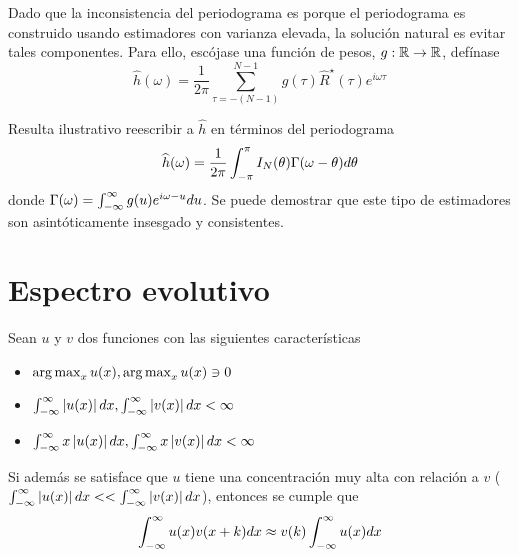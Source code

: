 Dado que la inconsistencia del periodograma es porque el periodograma es construido usando 
estimadores con varianza elevada, la solución natural es evitar tales componentes. Para ello, 
escójase una función de pesos, $g: \mathbb{R} \rightarrow \mathbb{R}$, defínase
%
\begin{equation}
\widehat{h}(\omega) = \frac{1}{2 \pi} \sum_{\tau = -(N-1)}^{N-1} g(\tau) \widehat{R}^{\star}(\tau) 
e^{i \omega \tau} 
\label{txt_estimador}
\end{equation}

Resulta ilustrativo reescribir a $\widehat{h}$ en términos del periodograma
\begin{equation*}
\widehat{h}(\omega) = \frac{1}{2 \pi} \int_{-\pi}^{\pi} I_N(\theta) \Gamma(\omega - \theta) d\theta
\end{equation*}
donde $\Gamma(\omega) = \int_{-\infty}^{\infty} g(u) e^{i \omega -u } du$.
%
Se puede demostrar que este tipo de estimadores son asintóticamente insesgado y consistentes.


\chapter{Espectro evolutivo}

\begin{proposicion}
Sean $u$ y $v$ dos funciones con las siguientes características
\begin{itemize}
\item $\operatorname{arg\,max}_x u(x), \operatorname{arg\,max}_x u(x) \ni 0$
\item $\int_{-\infty}^{\infty} \left| u(x) \right| dx, \int_{-\infty}^{\infty} \left| v(x) \right| dx < \infty$
\item $\int_{-\infty}^{\infty} x\left| u(x) \right| dx, \int_{-\infty}^{\infty} x\left| v(x) \right| dx < \infty$
\end{itemize} 
Si además se satisface que $u$ tiene una {concentración} muy alta con relación a $v$
($ \int_{-\infty}^{\infty} \left| u(x) \right| dx << \int_{-\infty}^{\infty} \left| v(x) \right| dx $),
entonces se cumple que
\begin{equation*}
\int_{-\infty}^{\infty} u(x) v(x+k) dx \approx v(k) \int_{-\infty}^{\infty} u(x) dx
\end{equation*}
\label{pseudo_d}
\end{proposicion}

